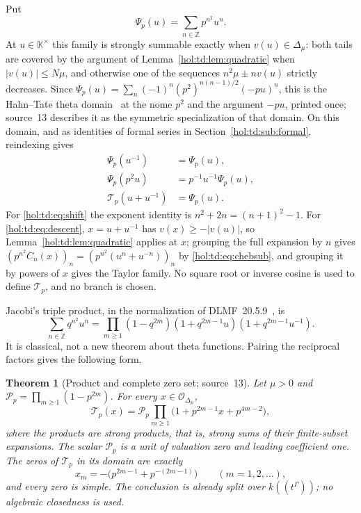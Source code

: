 \documentclass[11pt]{article}
\numberwithin{equation}{section}
\newtheorem{theorem}{Theorem}[section]
\theoremstyle{definition}
\theoremstyle{remark}
\newcommand{\Z}{\mathbb Z}
\newcommand{\abs}[1]{\lvert#1\rvert}
\newcommand{\KK}{\mathbb K}
\begin{document}
Put
\begin{equation}\label{hol:td:eq:psi}
 \Psi_p(u)=\sum_{n\in\Z}p^{n^2}u^n .
\end{equation}
At $u\in\KK^\times$ this family is strongly summable exactly when
$v(u)\in\Delta_\mu$: both tails are covered by the argument of
Lemma~\ref{hol:td:lem:quadratic} when $\abs{v(u)}\le N\mu$, and otherwise one
of the sequences $n^2\mu\pm nv(u)$ strictly decreases. Since
$\Psi_p(u)=\sum_n(-1)^n(p^2)^{n(n-1)/2}(-pu)^n$, this is the Hahn--Tate theta
domain~\cite[\texttt{tate:thm:theta}]{repotate} at the nome $p^2$ and the
argument $-pu$, printed once; source~13 describes it as the symmetric
specialization of that domain. On this domain, and as identities of formal
series in Section~\ref{hol:td:sub:formal}, reindexing gives
\begin{align}
 \Psi_p(u^{-1})&=\Psi_p(u),\label{hol:td:eq:inverse}\\
 \Psi_p(p^2u)&=p^{-1}u^{-1}\Psi_p(u),\label{hol:td:eq:shift}\\
 \mathcal T_p(u+u^{-1})&=\Psi_p(u).\label{hol:td:eq:descent}
\end{align}
For \eqref{hol:td:eq:shift} the exponent identity is $n^2+2n=(n+1)^2-1$. For
\eqref{hol:td:eq:descent}, $x=u+u^{-1}$ has $v(x)\ge-\abs{v(u)}$, so
Lemma~\ref{hol:td:lem:quadratic} applies at $x$; grouping the full expansion
by $n$ gives $(p^{n^2}C_n(x))_n=(p^{n^2}(u^n+u^{-n}))_n$ by
\eqref{hol:td:eq:chebsub}, and grouping it by powers of $x$ gives the Taylor
family. No square root or inverse cosine is used to define $\mathcal T_p$, and
no branch is chosen.

Jacobi's triple product, in the normalization of DLMF~20.5.9~\cite{dlmftheta},
is
\[
 \sum_{n\in\Z}q^{n^2}u^n
 =\prod_{m\ge1}(1-q^{2m})(1+q^{2m-1}u)(1+q^{2m-1}u^{-1}).
\]
It is classical, not a new theorem about theta functions. Pairing the
reciprocal factors gives the following form.

\begin{theorem}[Product and complete zero set; source~13]
\label{hol:td:thm:zeros}
Let $\mu>0$ and $\mathcal P_p=\prod_{m\ge1}(1-p^{2m})$. For every
$x\in\mathcal O_{\Delta_\mu}$,
\begin{equation}\label{hol:td:eq:product}
 \mathcal T_p(x)=\mathcal P_p\prod_{m\ge1}\bigl(1+p^{2m-1}x+p^{4m-2}\bigr),
\end{equation}
where the products are strong products, that is, strong sums of their
finite-subset expansions. The scalar $\mathcal P_p$ is a unit of valuation
zero and leading coefficient one. The zeros of $\mathcal T_p$ in its domain are
exactly
\begin{equation}\label{hol:td:eq:roots}
 x_m=-\bigl(p^{2m-1}+p^{-(2m-1)}\bigr)\qquad(m=1,2,\ldots),
\end{equation}
and every zero is simple. The conclusion is already split over
$k((t^\Gamma))$; no algebraic closedness is used.
\end{theorem}
\end{document}
